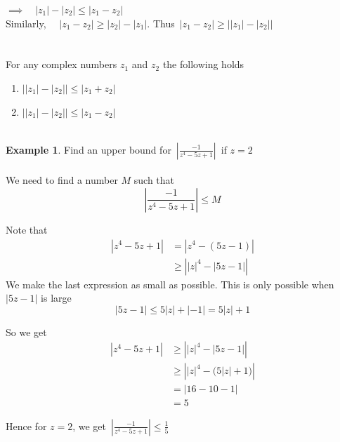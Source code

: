 \documentclass[11pt,a4paper]{article}
\theoremstyle{definition}
\newtheorem{example}[thm]{Example}
\begin{document}
$\implies\quad  \left|z_1\right| - \left|z_2\right| \leq \left|z_1 - z_2\right|$\\

Similarly, $\quad  \left|z_1 - z_2\right| \geq \left|z_2\right| - \left|z_1\right|$. Thus $\, \left|z_1 - z_2\right| \geq \left|\left|z_1\right| - \left|z_2\right|\right|$\\\\






\text{\textcolor{teal}{Lemma}}\\
For any complex numbers $z_1$ and $z_2$ the following holds
\begin{enumerate}
\item[i).] $\left|\left|z_1\right| - \left|z_2\right|\right| \leq \left|z_1 + z_2\right|$


\item[ii).]$\left|\left|z_1\right| - \left|z_2\right|\right| \leq \left|z_1 - z_2\right|$\\\\
\end{enumerate}





\begin{example}
Find an upper bound for $\,\displaystyle{\left|\frac{-1}{z^4 - 5z + 1}\right|}\,$ if $z = 2$\\

\text{\textcolor{red}{Solution}}\\
We need to find a number $M$ such that 
$$\left|\frac{-1}{z^4 - 5z + 1}\right|\leq M$$

Note that 
\begin{align*}
\left|z^4 - 5z + 1\right| & = \left|z^4 - (5z -1)\right|\\ 
& \geq \left|\left|z\right|^4 - \left|5z - 1\right|\right|
\end{align*}
We make the last expression as small as possible. This is only possible when $\left|5z - 1\right|$ is large 
$$\left|5z - 1\right| \leq 5\left|z\right| + \left|-1\right| = 5\left|z\right| + 1$$

So we get
\begin{align*}
\left|z^4 - 5z + 1\right|& \geq \left|\left|z\right|^4 - \left|5z - 1\right|\right|\\
& \geq \left|\left|z\right|^4 - \big(5\left|z\right| + 1\big)\right|\\
& = \left|16 - 10 -1\right|\\
& = 5
\end{align*}

Hence for $z = 2$, we get $\,\displaystyle{\left|\frac{-1}{z^4 - 5z + 1}\right| \leq \frac{1}{5}}$
\end{example}
\end{document}
